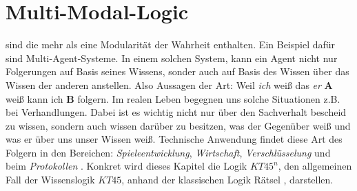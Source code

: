

\chapter{Multi-Modal-Logic} %
\label{sec:multi_modal_logic}
\MML sind \NML die mehr als eine Modularität der Wahrheit enthalten.
Ein Beispiel dafür sind Multi-Agent-Systeme. 
In einem solchen System, kann ein Agent nicht nur Folgerungen auf Basis seines Wissens, sonder auch auf Basis des Wissen über das Wissen der anderen anstellen. 
Also Aussagen der Art: Weil \emph{ich} weiß das \emph{er} \textbf{A} weiß kann ich \textbf{B} folgern.
Im realen Leben begegnen uns solche Situationen z.B. bei Verhandlungen.
Dabei ist es wichtig nicht nur über den Sachverhalt bescheid zu wissen, sondern auch wissen darüber zu besitzen, was der Gegenüber weiß und was er über uns unser Wissen weiß.
Technische Anwendung findet diese Art des Folgern in den Bereichen: \emph{Spieleentwicklung}, \emph{Wirtschaft}, \emph{Verschlüsselung} und beim \emph{Protokollen} .
Konkret wird dieses Kapitel die Logik $KT45^n$, den allgemeinen Fall der Wissenslogik $KT45$, anhand der klassischen Logik Rätsel \WM, darstellen.




